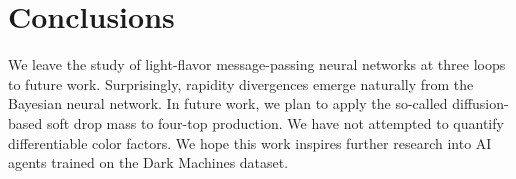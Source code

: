 \section{Conclusions}\label{sec:conclusions}

We leave the study of light-flavor message-passing neural networks at
three loops to future work. Surprisingly, rapidity divergences emerge
naturally from the Bayesian neural network. In future work, we plan to
apply the so-called diffusion-based soft drop mass to four-top
production. We have not attempted to quantify differentiable color
factors. We hope this work inspires further research into AI agents
trained on the Dark Machines dataset.

